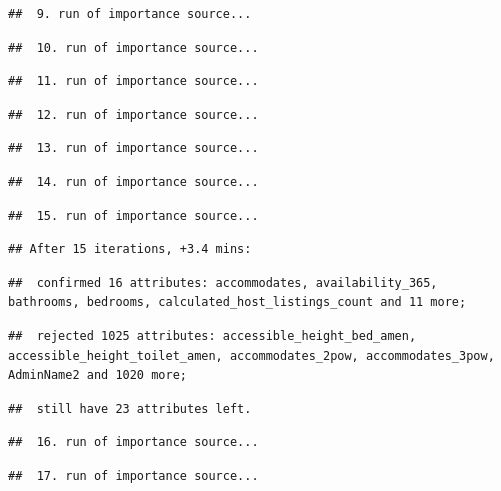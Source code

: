 \documentclass[
]{article}
\begin{document}
\begin{verbatim}
##  9. run of importance source...
\end{verbatim}

\begin{verbatim}
##  10. run of importance source...
\end{verbatim}

\begin{verbatim}
##  11. run of importance source...
\end{verbatim}

\begin{verbatim}
##  12. run of importance source...
\end{verbatim}

\begin{verbatim}
##  13. run of importance source...
\end{verbatim}

\begin{verbatim}
##  14. run of importance source...
\end{verbatim}

\begin{verbatim}
##  15. run of importance source...
\end{verbatim}

\begin{verbatim}
## After 15 iterations, +3.4 mins:
\end{verbatim}

\begin{verbatim}
##  confirmed 16 attributes: accommodates, availability_365, bathrooms, bedrooms, calculated_host_listings_count and 11 more;
\end{verbatim}

\begin{verbatim}
##  rejected 1025 attributes: accessible_height_bed_amen, accessible_height_toilet_amen, accommodates_2pow, accommodates_3pow, AdminName2 and 1020 more;
\end{verbatim}

\begin{verbatim}
##  still have 23 attributes left.
\end{verbatim}

\begin{verbatim}
##  16. run of importance source...
\end{verbatim}

\begin{verbatim}
##  17. run of importance source...
\end{verbatim}
\end{document}
